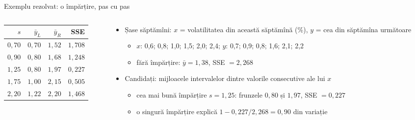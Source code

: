 \begin{frame}{Exemplu rezolvat: o împărțire, pas cu pas}
\itemsize{\footnotesize}
\begin{columns}[T]
\begin{column}{0.42\textwidth}
\begin{center}
\footnotesize
\begin{tabular}{rrrr}
\toprule
$s$ & $\bar y_L$ & $\bar y_R$ & SSE \\
\midrule
$0{,}70$ & $0{,}70$ & $1{,}52$ & $1{,}708$ \\
$0{,}90$ & $0{,}80$ & $1{,}68$ & $1{,}248$ \\
$1{,}25$ & $0{,}80$ & $1{,}97$ & $0{,}227$ \\
$1{,}75$ & $1{,}00$ & $2{,}15$ & $0{,}505$ \\
$2{,}20$ & $1{,}22$ & $2{,}20$ & $1{,}468$ \\
\bottomrule
\end{tabular}
\end{center}

\end{column}
\begin{column}{0.56\textwidth}
\begin{itemize}
    \item Șase săptămîni: $x$ = volatilitatea din această săptămînă (\%), $y$ = cea din săptămîna următoare
    \begin{itemize}
        \item $x$: 0,6; 0,8; 1,0; 1,5; 2,0; 2,4; $y$: 0,7; 0,9; 0,8; 1,6; 2,1; 2,2
        \item fără împărțire: $\bar y = 1{,}38$, SSE $= 2{,}268$
    \end{itemize}
    \item Candidați: mijloacele intervalelor dintre valorile consecutive ale lui $x$
    \begin{itemize}
        \item cea mai bună împărțire $s = 1{,}25$: frunzele $0{,}80$ și $1{,}97$, SSE $= 0{,}227$
        \item o singură împărțire explică $1 - 0{,}227/2{,}268 = 0{,}90$ din variație
    \end{itemize}
\end{itemize}
\end{column}
\end{columns}
\end{frame}

